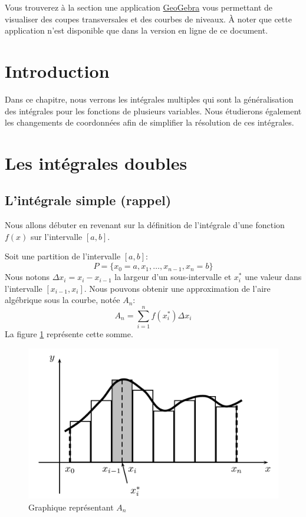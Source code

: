 \documentclass[]{book}
\theoremstyle{definition}
\theoremstyle{definition}
\theoremstyle{definition}
\theoremstyle{remark}
\begin{document}
Vous trouverez à la section une application
\href{https://www.geogebra.org/?lang=fr}{GeoGebra} vous permettant de
visualiser des coupes transversales et des courbes de niveaux. À noter
que cette application n'est disponible que dans la version en ligne de
ce document.

\hypertarget{introduction-6}{%
\section{Introduction}\label{introduction-6}}

Dans ce chapitre, nous verrons les intégrales multiples qui sont la
généralisation des intégrales pour les fonctions de plusieurs variables.
Nous étudierons également les changements de coordonnées afin de
simplifier la résolution de ces intégrales.

\hypertarget{les-integrales-doubles}{%
\section{Les intégrales doubles}\label{les-integrales-doubles}}

\hypertarget{lintegrale-simple-rappel}{%
\subsection{L'intégrale simple
(rappel)}\label{lintegrale-simple-rappel}}

Nous allons débuter en revenant sur la définition de l'intégrale d'une
fonction \(f(x)\) sur l'intervalle \([a,b]\).

Soit une partition de l'intervalle \([a,b]\):
\[P=\{x_0=a,x_1,\ldots,x_{n-1},x_n=b\}\] Nous notons
\(\Delta x_i=x_i-x_{i-1}\) la largeur d'un sous-intervalle et
\(x_i^{*}\) une valeur dans l'intervalle \([x_{i-1},x_i]\). Nous pouvons
obtenir une approximation de l'aire algébrique sous la courbe, notée
\(A_n\): \[A_n=\sum_{i=1}^n f(x_i^*)\Delta x_i\] La figure
\ref{fig:integralesimple} représente cette somme.

\begin{figure}

{\centering \includegraphics[width=0.75\linewidth]{resources/images/latex/integralesimple} 

}

\caption{Graphique représentant $A_n$}\label{fig:integralesimple}
\end{figure}
\end{document}
